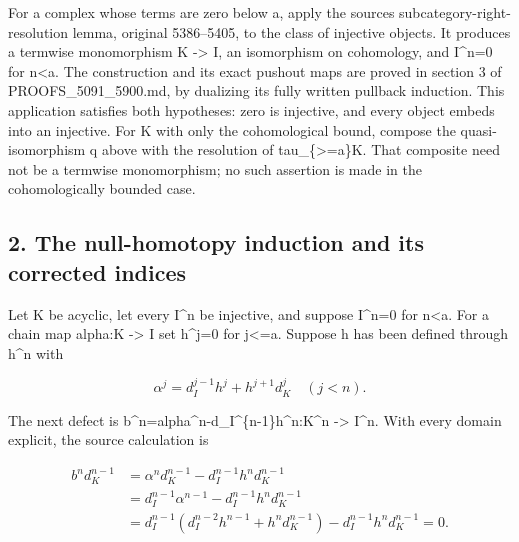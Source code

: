 \documentclass[11pt]{article}
\begin{document}
For a complex whose terms are zero below a,\allowbreak{} apply the source\textquotesingle s subcategory-right-resolution lemma,\allowbreak{} original 5386–\allowbreak{}5405,\allowbreak{} to the class of injective objects. It produces a termwise monomorphism K \allowbreak{}-> I,\allowbreak{} an isomorphism on cohomology,\allowbreak{} and I\textasciicircum{}n\allowbreak{}=0 for n\textless a. The construction and its exact pushout maps are proved in section 3 of PROOFS\_\allowbreak{}5091\_\allowbreak{}5900.md,\allowbreak{} by dualizing its fully written pullback induction. This application satisfies both hypotheses:\allowbreak{} zero is injective,\allowbreak{} and every object embeds into an injective. For K with only the cohomological bound,\allowbreak{} compose the quasi-isomorphism q above with the resolution of tau\_\allowbreak{}\{>\allowbreak{}=a\}K. That composite need not be a termwise monomorphism; no such assertion is made in the cohomologically bounded case.

\subsection{2. The null-homotopy induction and its corrected indices}\label{proofs-6209-7089-the-null-homotopy-induction-and-its-corrected-indices}

Let K be acyclic,\allowbreak{} let every I\^{}n be injective,\allowbreak{} and suppose I\textasciicircum{}n\allowbreak{}=0 for n\textless a. For a chain map alpha:\allowbreak{}K \allowbreak{}-> I set h\textasciicircum{}j\allowbreak{}=0 for j<\allowbreak{}=a. Suppose h has been defined through h\^{}n with

\[
 \alpha^j=d_I^{j-1}h^j+h^{j+1}d_K^j\quad(j<n).
\]

The next defect is b\textasciicircum{}n\allowbreak{}=alpha\textasciicircum{}n-d\_\allowbreak{}I\textasciicircum{}\{n-1\}h\textasciicircum{}n:\allowbreak{}K\textasciicircum{}n \allowbreak{}-> I\^{}n. With every domain explicit,\allowbreak{} the source calculation is

\[
\begin{aligned}
 b^n d_K^{n-1}
 &=\alpha^n d_K^{n-1}-d_I^{n-1}h^n d_K^{n-1}\\
 &=d_I^{n-1}\alpha^{n-1}-d_I^{n-1}h^n d_K^{n-1}\\
 &=d_I^{n-1}(d_I^{n-2}h^{n-1}+h^n d_K^{n-1})
                      -d_I^{n-1}h^n d_K^{n-1}=0.          
\end{aligned}
\tag{2.1}\]
\end{document}
